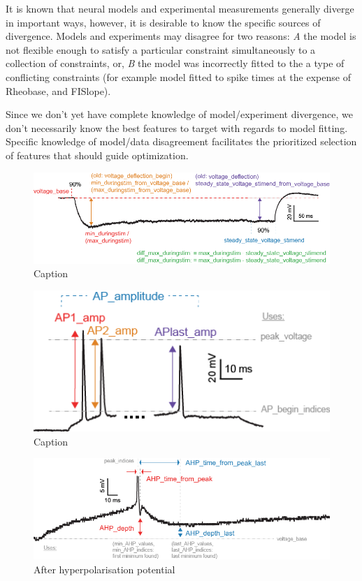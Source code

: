
It is known that neural models and experimental measurements generally diverge in important ways, however, it is desirable to know the specific sources of divergence. Models and experiments may disagree for two reasons: \emph{A} the model is not flexible enough to satisfy a particular constraint simultaneously to a collection of constraints, or, \emph{B} the model was incorrectly fitted to the a type of conflicting constraints (for example model fitted to spike times at the expense of Rheobase, and FISlope). 

Since we don't yet have complete knowledge of model/experiment divergence, we don't necessarily know the best features to target with regards to model fitting. Specific knowledge of model/data disagreement facilitates the prioritized selection of features that should guide optimization. 

\begin{figure}
    \centering
    \includegraphics{figures/voltage_features.png}
    \caption{Caption}
    \label{fig:voltage_figures}
\end{figure}
\begin{figure}
    \centering
    \includegraphics{figures/AP_Amplitude.png}
    \caption{Caption}
    \label{fig:features_example}
\end{figure}

\begin{figure}
    \centering
    \includegraphics{figures/AHP.png}
    \caption{After hyperpolarisation potential }
    \label{fig:features_example_ahp}
\end{figure}



